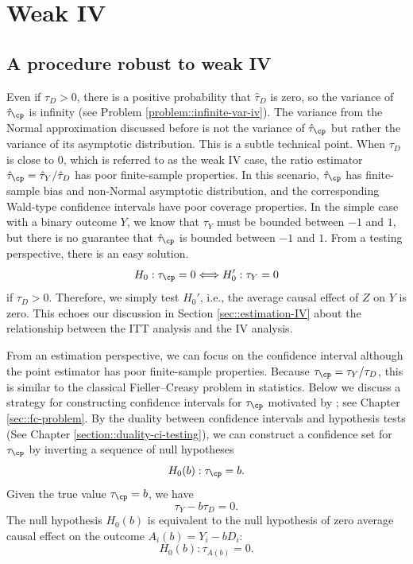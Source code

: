\section{Weak IV}

\subsection{A procedure robust to weak IV}
 
Even if $\tau_D >0$, there is a positive probability that $\hat{\tau}_D$ is zero, so the variance of $\hat{\tau}_\cp$ is infinity (see Problem \ref{problem::infinite-var-iv}). The variance from the Normal approximation discussed before is not the variance of  $\hat{\tau}_\cp$ but rather the variance of its asymptotic distribution. This is a subtle technical point.  When $ \tau_D$ is close to $0$, which is referred to as the weak IV case, the ratio estimator $\hat{\tau}_\cp = \hat{\tau}_Y / \hat{\tau}_D$ has poor finite-sample properties.  In this scenario, $\hat{\tau}_\cp$ has finite-sample bias and non-Normal asymptotic distribution, and the corresponding Wald-type confidence intervals have poor coverage properties. In the simple case with a binary outcome $Y$, we know that $\tau_Y$ must be bounded between $-1$ and $1$, but there is no guarantee that $\hat{\tau}_\cp$ is bounded between $-1$ and $1$.
From a testing perspective, there is an easy solution.
$$
H_0: \tau_\cp  = 0 \Longleftrightarrow H_0': \tau_Y = 0
$$
if $\tau_D > 0$. 
Therefore, we simply test $H_0'$, i.e., the average causal effect of $Z$ on $Y$ is zero. This echoes our discussion in Section \ref{sec::estimation-IV} about the relationship between the ITT analysis and the IV analysis. 


From an estimation perspective, we can focus on the confidence interval although the point estimator has poor finite-sample properties. Because $\tau_\cp = \tau_Y / \tau_D$, this is similar to the classical Fieller--Creasy problem in statistics. Below we discuss a strategy for constructing confidence intervals for $\tau_\cp$ motivated by \citet{fieller1954some}; see Chapter \ref{sec::fc-problem}. 
By the duality between confidence intervals and hypothesis tests (See Chapter \ref{section::duality-ci-testing}), we can construct a confidence set for $\tau_\cp$ by inverting a sequence of null hypotheses
$$
H_0(b): \tau_\cp = b . 
$$ 
Given the true value $\tau_\cp = b$, we have
$$
 \tau_Y  - b  \tau_D  = 0.
$$
The null hypothesis $H_0(b)$ is equivalent to the null hypothesis of zero average causal effect on the outcome $A_i( b) = Y_i - b  D_i $:
$$
H_0(b): \tau_{A(b)} = 0 .
$$


